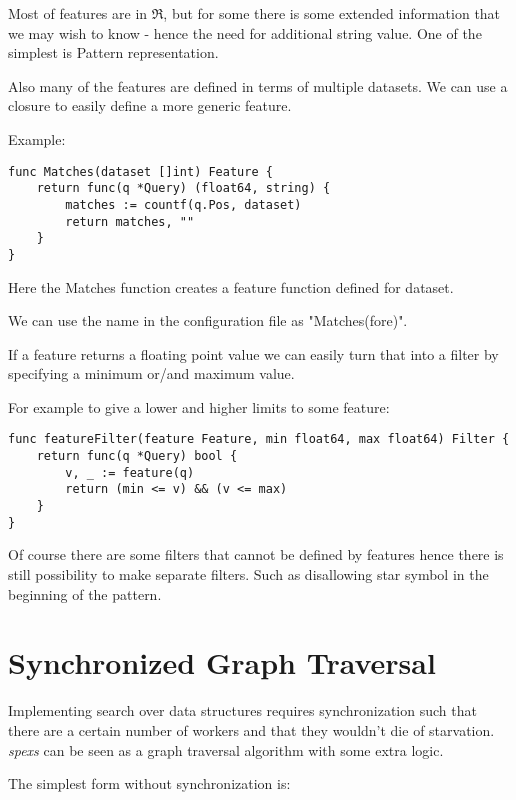 Most of features are in $\Re$, but for some there
is some extended information that we may wish to know - hence
the need for additional string value. One of the simplest
is Pattern representation.

Also many of the features are defined in terms of multiple datasets.
We can use a closure to easily define a more generic feature.

Example:

\begin{verbatim}
func Matches(dataset []int) Feature {
    return func(q *Query) (float64, string) {
        matches := countf(q.Pos, dataset)
        return matches, ""
    }
}
\end{verbatim}

Here the Matches function creates a feature function defined
for dataset.

We can use the name in the configuration file as "Matches(fore)".

If a feature returns a floating point value we can easily turn that
into a filter by specifying a minimum or/and maximum value.

For example to give a lower and higher limits to some feature:

\begin{verbatim}
func featureFilter(feature Feature, min float64, max float64) Filter {
    return func(q *Query) bool {
        v, _ := feature(q)
        return (min <= v) && (v <= max)
    }
}
\end{verbatim}

Of course there are some filters that cannot be defined by features hence
there is still possibility to make separate filters. Such as disallowing
star symbol in the beginning of the pattern.

\section{Synchronized Graph Traversal}

Implementing search over data structures requires synchronization such that there are a certain number of workers and that they wouldn't die of starvation. \emph{spexs} can be seen as a graph traversal algorithm with some extra logic.

The simplest form without synchronization is:

